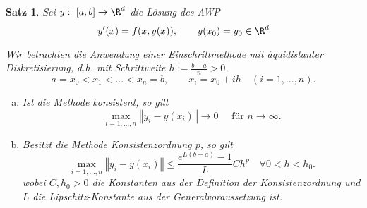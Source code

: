 \documentclass[
]{mycourse}
\theoremstyle{mythm}
\newtheorem{theorem}{Satz}[chapter]
\theoremstyle{break}
\newcommand{\norm}[1]{\left\Vert#1\right\Vert}		%
\begin{document}
\begin{theorem}\label{satz:konv_Einschritt}
Sei $y:\ [a,b]\to \R^d$ die Lösung des AWP
\[
y'(x)=f(x,y(x)), \qquad y(x_0)=y_0\in \R^d
\]

Wir betrachten die Anwendung einer Einschrittmethode mit
äquidistanter Diskretisierung, d.h. mit Schrittweite $h:=\frac{b-a}{n}>0$,
\[
a=x_0 < x_1 < \ldots < x_n=b, \qquad x_i=x_0+ih \quad (i=1,\ldots,n).
\]
%
\begin{enumerate}[(a)]
\item Ist die Methode konsistent, so gilt
\[
\max_{i=1,\ldots,n} \norm{y_i-y(x_i)}\to 0 \quad \mbox{ für $n\to \infty$}.
\]
%
\item Besitzt die Methode Konsistenzordnung $p$, so gilt
\[
\max_{i=1,\ldots,n} \norm{y_i-y(x_i)}\leq \frac{e^{L(b-a)}-1}{L} C h^p \quad \forall 0<h<h_0.
\]
wobei $C,h_0>0$ die Konstanten aus der Definition der Konsistenzordnung und $L$ die Lipschitz-Konstante
aus der Generalvoraussetzung ist.
\end{enumerate}
\end{theorem}
\end{document}
